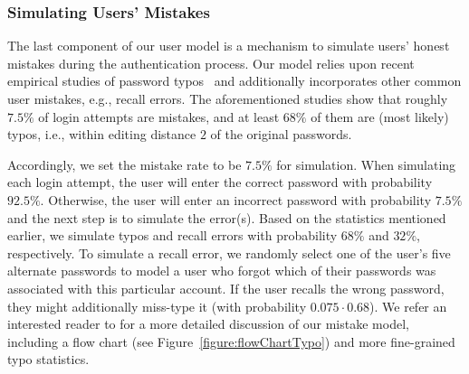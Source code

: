 \subsubsection{Simulating Users' Mistakes}\label{section:ExperimentDesign-subsection:SimulateUser-subsubsection:SimulateUserMistake} %

The last component of our user model is a mechanism to simulate users’ honest mistakes during the authentication process. Our model relies upon recent empirical studies of password typos~\cite{CCS:CWPCR17,SP:CAAJR16} and additionally incorporates other common user mistakes, e.g., recall errors. The aforementioned studies show that roughly $7.5\%$ of login attempts are mistakes, and at least $68\%$ of them are (most likely) typos, i.e., within editing distance $2$ of the original passwords.  



Accordingly, we set the mistake rate to be $7.5\%$ for simulation. When simulating each login attempt, the user will enter the correct password with probability $92.5\%$. Otherwise, the user will enter an incorrect password with probability $7.5\%$ and the next step is to simulate the error(s). Based on the statistics mentioned earlier, we simulate typos and recall errors with probability $68\%$ and $32\%$, respectively. To simulate a recall error, we randomly select one of the user's five alternate passwords to model a user who forgot which of their passwords was associated with this particular account. If the user recalls the wrong password, they might additionally miss-type it (with probability $0.075\cdot 0.68$).  We refer an interested reader to  for a more detailed discussion of our mistake model, including a flow chart (see Figure~\ref{figure:flowChartTypo}) and more fine-grained typo statistics.

















